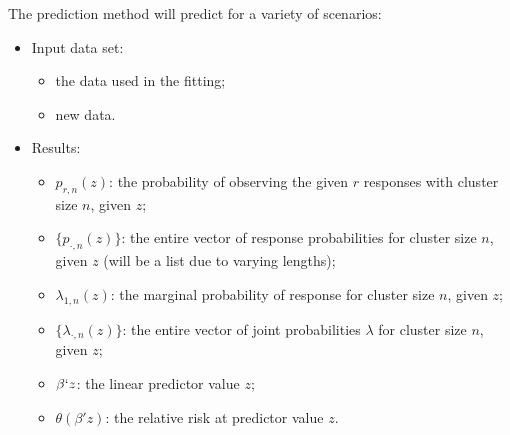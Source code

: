 \documentclass[reqno]{amsart}
\begin{document}
The prediction method will predict for a variety of scenarios:
\begin{itemize}
\item Input data set:
  \begin{itemize}
    \item the data used in the fitting;
    \item new data.
  \end{itemize}
\item Results:
  \begin{itemize}
    \item $p_{r,n}(z)$: the probability of observing the given $r$ responses with cluster size $n$, given $z$;
    \item $\{p_{\cdot,n}(z)\}$: the entire vector of response probabilities for cluster size $n$, given $z$ (will be a list due to varying lengths);
    \item $\lambda_{1,n}(z)$: the marginal probability of response for cluster size $n$, given $z$;
    \item $\{\lambda_{\cdot,n}(z)\}$: the entire vector of joint probabilities $\lambda$ for cluster size $n$, given $z$;
    \item $\beta`z$: the linear predictor value $z$;
    \item $\theta(\beta'z)$: the relative risk at predictor value $z$.
  \end{itemize}
\end{itemize}
\end{document}
